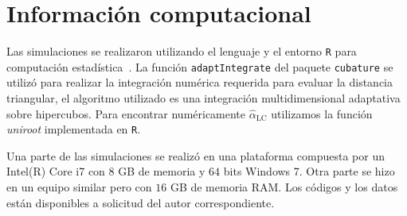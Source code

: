 \chapter{Información computacional}


Las simulaciones se realizaron utilizando el lenguaje y el entorno \texttt R para computación estadística~\cite{RLanguage}.
La función \texttt{adaptIntegrate} del paquete \texttt{cubature} se utilizó para realizar la integración numérica requerida para evaluar la distancia triangular, el algoritmo utilizado es una integración multidimensional adaptativa sobre hipercubos. Para encontrar numéricamente $\widehat\alpha_{\text{LC}}$ utilizamos la función \textit{uniroot} implementada en \texttt R.

Una parte de las simulaciones se realizó en una plataforma compuesta por un Intel(R) Core i7 con $8$ GB de memoria y $64$ bits  Windows  7. Otra parte se hizo en un equipo similar pero con $16$ GB de memoria RAM.
Los códigos y los datos están disponibles a solicitud del autor correspondiente.
